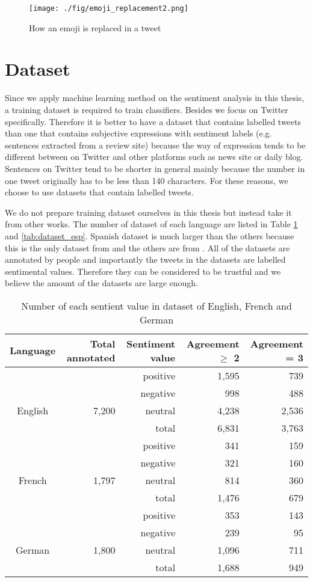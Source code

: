 \begin{figure}
	\centering
	\texttt{[image: ./fig/emoji\_replacement2.png]}
	\caption{How an emoji is replaced in a tweet}
	\label{fig:emoji_replacement}
\end{figure}

\section{Dataset}\label{sec:dataset}
Since we apply machine learning method on the sentiment analysis in this thesis, a training dataset is required to train classifiers.
Besides we focus on Twitter specifically.
Therefore it is better to have a dataset that contains labelled tweets than one that contains subjective expressions with sentiment labels (e.g. sentences extracted from a review site) because the way of expression tends to be different between on Twitter and other platforms such as news site or daily blog.
Sentences on Twitter tend to be shorter in general mainly because the number in one tweet originally has to be less than 140 characters.
For these reasons, we choose to use datasets that contain labelled tweets.  

We do not prepare training dataset ourselves in this thesis but instead take it from other works.
The number of dataset of each language are listed in Table \ref{tab:dataset2} and \ref{tab:dataset_esp}.
Spanish dataset is much larger than the others because this is the only dataset from \cite{dataset_spanish} and the others are from \cite{dataset}.
All of the datasets are annotated by people and importantly the tweets in the datasets are labelled sentimental values.
Therefore they can be considered to be trustful and we believe the amount of the datasets are large enough.
\begin{table}[ht]
	\caption{Number of each sentient value in dataset of English, French and German}
	\centering
	\begin{tabular}{|c|r|r|r|r|} \hline
	Language & Total annotated & Sentiment value & Agreement $\geq$ 2 & Agreement = 3\\ \hline \hline
	& & positive & 1,595 & 739 \\ \cline{3-5}
	& & negative & 998 & 488\\ \cline{3-5}
	English & 7,200 & neutral & 4,238 & 2,536 \\ \hline
	& & total & 6,831 & 3,763 \\ \hline
	& & positive & 341 & 159\\ \cline{3-5}
	& & negative & 321 & 160\\ \cline{3-5}
	French & 1,797 & neutral & 814 & 360  \\ \hline
	& & total & 1,476 & 679 \\ \hline
	& & positive & 353 & 143\\ \cline{3-5}
	& & negative & 239 & 95\\ \cline{3-5}
	German & 1,800 & neutral & 1,096 & 711\\ \hline
	& & total & 1,688 & 949\\ \hline
	\end{tabular}
	\label{tab:dataset2}
\end{table}

